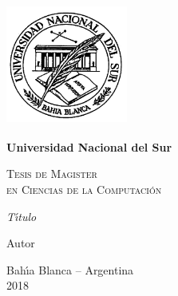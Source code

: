 \begin{titlepage}

\begin{center}
\includegraphics[width=4cm,height=4cm]{UniLogo}
\end{center}

\begin{center}

\textbf{\LARGE Universidad Nacional del Sur}\\

\vspace{2cm}

\textsc{\LARGE Tesis de Magister }\\ \vspace{.1cm}
\textsc{\LARGE en Ciencias de la Computación}\\

\vspace{4cm}

\emph{\LARGE T\'{\i}tulo}\\

\vspace{2.5cm}

{\Large Autor}\\

\vspace{2.5cm}

{\sc\Large Bah\'{\i}a Blanca -- Argentina}\\
\vspace*{.1cm} {\Large 2018}

\end{center}
\end{titlepage}

